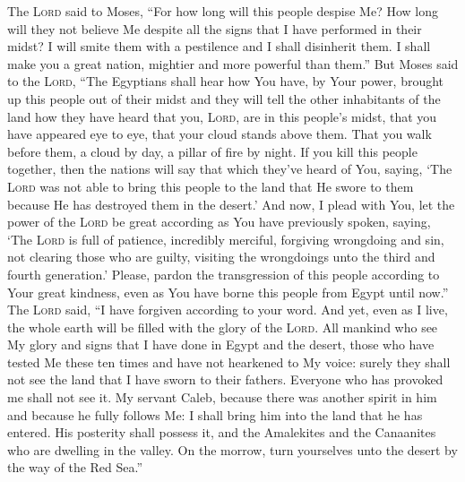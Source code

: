 \begin{inparaenum}
   The \textsc{Lord} said to Moses, ``For how long will this people despise Me? How long will they not believe Me despite all the signs that I have performed in their midst?%
   I will smite them with a pestilence and I shall disinherit them. I shall make you a great nation, mightier and more powerful than them.''%
   But Moses said to the \textsc{Lord}, ``The Egyptians shall hear how You have, by Your power, brought up this people out of their midst%
   and they will tell the other inhabitants of the land how they have heard that you, \textsc{Lord}, are in this people's midst, that you have appeared eye to eye, that your cloud stands above them. That you walk before them, a cloud by day, a pillar of fire by night.%
   If you kill this people together, then the nations will say that which they've heard of You, saying,%
   `The \textsc{Lord} was not able to bring this people to the land that He swore to them because He has destroyed them in the desert.'%
   And now, I plead with You, let the power of the \textsc{Lord} be great according as You have previously spoken, saying,%
   `The \textsc{Lord} is full of patience, incredibly merciful, forgiving wrongdoing and sin, not clearing those who are guilty, visiting the wrongdoings unto the third and fourth generation.'%
   Please, pardon the transgression of this people according to Your great kindness, even as You have borne this people from Egypt until now.''%
   The \textsc{Lord} said, ``I have forgiven according to your word.%
   And yet, even as I live, the whole earth will be filled with the glory of the \textsc{Lord}.%
   All mankind who see My glory and signs that I have done in Egypt and the desert, those who have tested Me these ten times and have not hearkened to My voice:%
   surely they shall not see the land that I have sworn to their fathers. Everyone who has provoked me shall not see it.%
   My servant Caleb, because there was another spirit in him and because he fully follows Me: I shall bring him into the land that he has entered. His posterity shall possess it,%
   and the Amalekites and the Canaanites who are dwelling in the valley. On the morrow, turn yourselves unto the desert by the way of the Red Sea.''%
  

\end{inparaenum}
